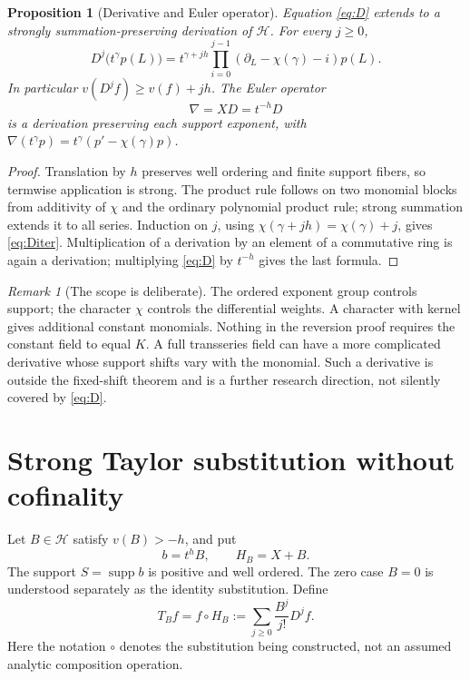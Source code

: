\documentclass[11pt,a4paper]{article}
\newtheorem{proposition}[theorem]{Proposition}
\theoremstyle{definition}
\theoremstyle{remark}
\newtheorem{remark}[theorem]{Remark}
\newcommand{\HH}{\mathscr H}
\newcommand{\supp}{\operatorname{supp}}
\begin{document}
\begin{proposition}[Derivative and Euler operator]\label{prop:derivative}
Equation \eqref{eq:D} extends to a strongly summation-preserving derivation
of $\HH$. For every $j\ge0$,
\begin{equation}\label{eq:Diter}
 D^j\bigl(t^\gamma p(L)\bigr)
 =t^{\gamma+jh}\prod_{i=0}^{j-1}
       (\partial_L-\chi(\gamma)-i)p(L).
\end{equation}
In particular $v(D^j f)\ge v(f)+jh$. The Euler operator
\begin{equation}\label{eq:Euler}
 \nabla=XD=t^{-h}D
\end{equation}
is a derivation preserving each support exponent, with
$\nabla(t^\gamma p)=t^\gamma(p'-\chi(\gamma)p)$.
\end{proposition}
\begin{proof}
Translation by $h$ preserves well ordering and finite support fibers, so
termwise application is strong. The product rule follows on two monomial
blocks from additivity of $\chi$ and the ordinary polynomial product rule;
strong summation extends it to all series. Induction on $j$, using
$\chi(\gamma+jh)=\chi(\gamma)+j$, gives \eqref{eq:Diter}.
Multiplication of a derivation by an element of a commutative ring is again
a derivation; multiplying \eqref{eq:D} by $t^{-h}$ gives the last formula.
\end{proof}

\begin{remark}[The scope is deliberate]
The ordered exponent group controls support; the character $\chi$ controls
the differential weights. A character with kernel gives additional
constant monomials. Nothing in the reversion proof requires the constant
field to equal $K$. A full transseries field can have a more complicated
derivative whose support shifts vary with the monomial. Such a derivative
is outside the fixed-shift theorem and is a further research direction,
not silently covered by \eqref{eq:D}.
\end{remark}

\section{Strong Taylor substitution without cofinality}
\label{sec:substitution}

Let $B\in\HH$ satisfy $v(B)>-h$, and put
\[
 b=t^hB,\qquad H_B=X+B.
\]
The support $S=\supp b$ is positive and well ordered. The zero case $B=0$
is understood separately as the identity substitution. Define
\begin{equation}\label{eq:Taylor}
 T_Bf=f\circ H_B:=\sum_{j\ge0}\frac{B^j}{j!}D^jf.
\end{equation}
Here the notation $\circ$ denotes the substitution being constructed,
not an assumed analytic composition operation.
\end{document}
